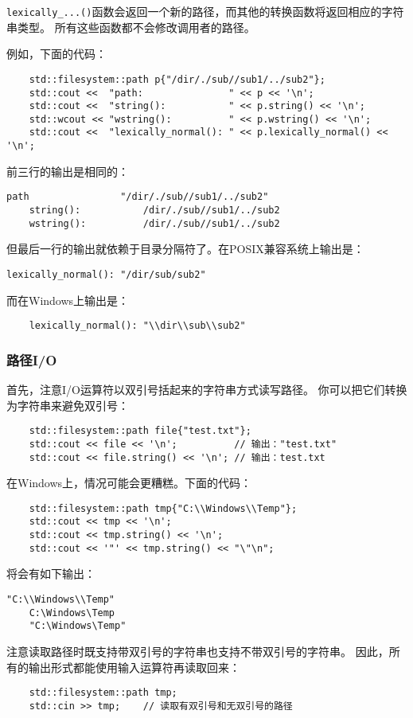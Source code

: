 \texttt{lexically\_...()}函数会返回一个新的路径，而其他的转换函数将返回相应的字符串类型。
所有这些函数都不会修改调用者的路径。

例如，下面的代码：
\begin{lstlisting}
    std::filesystem::path p{"/dir/./sub//sub1/../sub2"};
    std::cout <<  "path:               " << p << '\n';
    std::cout <<  "string():           " << p.string() << '\n';
    std::wcout << "wstring():          " << p.wstring() << '\n';
    std::cout <<  "lexically_normal(): " << p.lexically_normal() << '\n';
\end{lstlisting}
前三行的输出是相同的：
\begin{lstlisting}[stringstyle=\color{black}]
    path                "/dir/./sub//sub1/../sub2"
    string():           /dir/./sub//sub1/../sub2
    wstring():          /dir/./sub//sub1/../sub2
\end{lstlisting}
但最后一行的输出就依赖于目录分隔符了。在POSIX兼容系统上输出是：
\begin{lstlisting}[stringstyle=\color{black}]
    lexically_normal(): "/dir/sub/sub2"
\end{lstlisting}
而在Windows上输出是：
\begin{lstlisting}
    lexically_normal(): "\\dir\\sub\\sub2"
\end{lstlisting}

\subsubsection{路径I/O}
首先，注意I/O运算符以双引号括起来的字符串方式读写路径。
你可以把它们转换为字符串来避免双引号：
\begin{lstlisting}
    std::filesystem::path file{"test.txt"};
    std::cout << file << '\n';          // 输出："test.txt"
    std::cout << file.string() << '\n'; // 输出：test.txt
\end{lstlisting}
在Windows上，情况可能会更糟糕。下面的代码：
\begin{lstlisting}
    std::filesystem::path tmp{"C:\\Windows\\Temp"};
    std::cout << tmp << '\n';
    std::cout << tmp.string() << '\n';
    std::cout << '"' << tmp.string() << "\"\n";
\end{lstlisting}
将会有如下输出：
\begin{lstlisting}[stringstyle=\color{black}]
    "C:\\Windows\\Temp"
    C:\Windows\Temp
    "C:\Windows\Temp"
\end{lstlisting}
注意读取路径时既支持带双引号的字符串也支持不带双引号的字符串。
因此，所有的输出形式都能使用输入运算符再读取回来：
\begin{lstlisting}
    std::filesystem::path tmp;
    std::cin >> tmp;    // 读取有双引号和无双引号的路径
\end{lstlisting}

